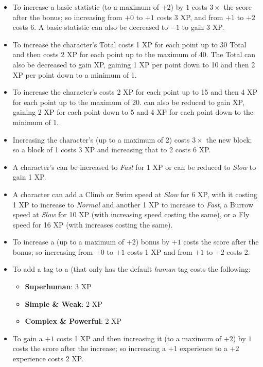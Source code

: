 \begin{itemize}
  \item To increase a basic statistic (to a maximum of $+2$) by $1$ costs $3 \times$ the score after the bonus; so increasing from $+0$ to $+1$ costs 3 XP, and from $+1$ to $+2$ costs 6.
    A basic statistic can also be decreased to $-1$ to gain 3 XP.
  \item To increase the character's Total \Life{} costs 1 XP for each point up to 30 Total \Life{} and then costs 2 XP for each point up to the maximum of 40.
    The Total \Life{} can also be decreased to gain XP, gaining 1 XP per point down to 10 and then 2 XP per point down to a minimum of 1.
  \item To increase the character's \Recovery{} costs 2 XP for each point up to 15 and then 4 XP for each point up to the maximum of 20.
    \Recovery{} can also be reduced to gain XP, gaining 2 XP for each point down to 5 and 4 XP for each point down to the minimum of 1.
  \item Increasing the character's \Block{} (up to a maximum of 2) costs $3 \times$ the new block; so a block of 1 costs 3 XP and increasing that to 2 costs 6 XP.
  \item A character's \Speed{} can be increased to \emph{Fast} for 1 XP or can be reduced to \emph{Slow} to gain 1 XP.
  \item A character can add a Climb or Swim speed at \emph{Slow} for 6 XP, with it costing 1 XP to increase to \emph{Normal} and another 1 XP to increase to \emph{Fast}, a Burrow speed at \emph{Slow} for 10 XP (with increasing speed costing the same), or a Fly speed for 16 XP (with increases costing the same).
  \item To increase a \Specialization{} (up to a maximum of $+2$) bonus by $+1$ costs the score after the bonus; so increasing from $+0$ to $+1$ costs 1 XP and from $+1$ to $+2$ costs 2.
  \item To add a tag to a \Specialization{} (that only has the default \emph{human} tag costs the following:
    \begin{itemize}
      \item \textbf{Superhuman}: 3 XP
      \item \textbf{Simple \& Weak}: 2 XP
      \item \textbf{Complex \& Powerful}: 2 XP
    \end{itemize}
  \item To gain a $+1$ \Experience{} costs 1 XP and then increasing it (to a maximum of $+2$) by $1$ costs the score after the increase; so increasing a $+1$ experience to a $+2$ experience costs 2 XP.

\end{itemize}
